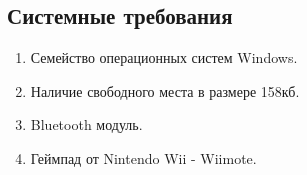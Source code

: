 \subsection{Системные требования}
\begin{enumerate}
    \item Семейство операционных систем Windows.
    \item Наличие свободного места в размере 158кб.
    \item Bluetooth модуль.
    \item Геймпад от Nintendo Wii - Wiimote.
\end{enumerate}



